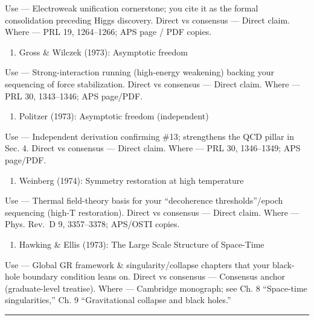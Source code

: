 \documentclass[
]{article}
\providecommand{\tightlist}{%
  \setlength{\itemsep}{0pt}\setlength{\parskip}{0pt}}
\begin{document}
Use --- Electroweak unification cornerstone; you cite it as the formal
consolidation preceding Higgs discovery. Direct vs consensus --- Direct
claim. Where --- PRL 19, 1264--1266; APS page / PDF copies.

\begin{enumerate}
\def\labelenumi{\arabic{enumi})}
\setcounter{enumi}{12}
\tightlist
\item
  Gross \& Wilczek (1973): Asymptotic freedom
\end{enumerate}

Use --- Strong-interaction running (high-energy weakening) backing your
sequencing of force stabilization. Direct vs consensus --- Direct claim.
Where --- PRL 30, 1343--1346; APS page/PDF.

\begin{enumerate}
\def\labelenumi{\arabic{enumi})}
\setcounter{enumi}{13}
\tightlist
\item
  Politzer (1973): Asymptotic freedom (independent)
\end{enumerate}

Use --- Independent derivation confirming \#13; strengthens the QCD
pillar in Sec. 4. Direct vs consensus --- Direct claim. Where --- PRL
30, 1346--1349; APS page/PDF.

\begin{enumerate}
\def\labelenumi{\arabic{enumi})}
\setcounter{enumi}{14}
\tightlist
\item
  Weinberg (1974): Symmetry restoration at high temperature
\end{enumerate}

Use --- Thermal field-theory basis for your ``decoherence
thresholds''/epoch sequencing (high-T restoration). Direct vs consensus
--- Direct claim. Where --- Phys. Rev.~D 9, 3357--3378; APS/OSTI copies.

\begin{enumerate}
\def\labelenumi{\arabic{enumi})}
\setcounter{enumi}{15}
\tightlist
\item
  Hawking \& Ellis (1973): The Large Scale Structure of Space-Time
\end{enumerate}

Use --- Global GR framework \& singularity/collapse chapters that your
black-hole boundary condition leans on. Direct vs consensus ---
Consensus anchor (graduate-level treatise). Where --- Cambridge
monograph; see Ch. 8 ``Space-time singularities,'' Ch. 9 ``Gravitational
collapse and black holes.''

\begin{center}\rule{0.5\linewidth}{0.5pt}\end{center}
\end{document}

